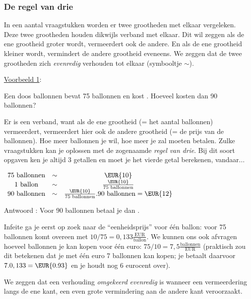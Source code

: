 \subsubsection{De regel van drie}

In een aantal vraagstukken worden er twee grootheden met elkaar vergeleken.
Deze twee grootheden houden dikwijls verband met elkaar. Dit wil zeggen
als de ene grootheid groter wordt, vermeerdert ook de andere. En als
de ene grootheid kleiner wordt, vermindert de andere grootheid eveneens.
We zeggen dat de twee grootheden zich \emph{evenredig} verhouden tot
elkaar (symbooltje $\sim$).\medskip{}


\uline{Voorbeeld 1}: 

Een doos ballonnen bevat 75 ballonnen en kost . Hoeveel kosten
dan 90 ballonnen?

Er is een verband, want als de ene grootheid (= het aantal ballonnen)
vermeerdert, vermeerdert hier ook de andere grootheid (= de prijs
van de ballonnen). Hoe meer ballonnen je wil, hoe meer je zal moeten
betalen. Zulke vraagstukken kan je oplossen met de zogenaamde \emph{regel
van drie}. Bij dit soort opgaven ken je altijd 3 getallen en moet
je het vierde getal berekenen, vandaar...

\medskip{}

$\begin{array}{ccc}
75 ~\text{ballonnen} & \sim & \text{\EUR{10}} \\
1 ~\text{ballon} & \sim & \frac{\text{\EUR{10}}}{75 \text{ ballonnen}} \\ 
90 ~\text{ballonnen} & \sim & \frac{\text{\EUR{10}}}{75 \text{ ballonnen}}.90 \text{ ballonnen} = \text{\EUR{12}}\\ 
\end{array}$

Antwoord : Voor 90 ballonnen betaal je dan .

Infeite ga je eerst op zoek naar de ``eenheidsprijs'' voor \'e\'en ballon:
 voor 75 ballonnen komt overeen met $10/75=0,133\frac{\text{EUR}}{\text{ballon}}$.
We kunnen ons ook afvragen hoeveel ballonnen je kan kopen voor \'e\'en
euro: $75/10=7,5\frac{\text{ballonnen}}{\text{EUR}}$ (praktisch zou dit betekenen dat je met \'e\'en euro 7 ballonnen kan kopen; je betaalt daarvoor $7.0,133=\text{\EUR{0.93}}$
en je houdt nog 6 eurocent over). \bigskip{}


We zeggen dat een verhouding \emph{omgekeerd evenredig} is wanneer
een vermeerdering langs de ene kant, een even grote vermindering aan
de andere kant veroorzaakt. 

